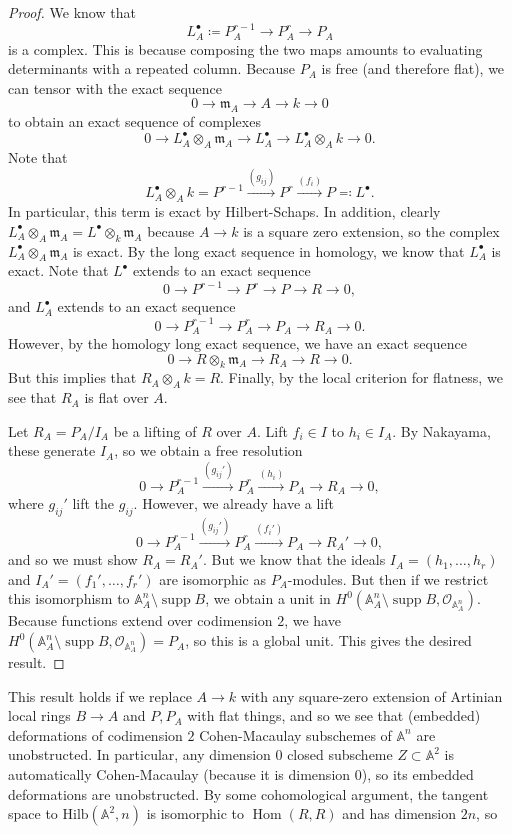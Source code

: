 \documentclass[leqno, openany]{memoir}
\theoremstyle{definition}
\theoremstyle{remark}
\theoremstyle{plain}
\theoremstyle{definition}
\theoremstyle{remark}
\newcommand{\A}{\mathbb{A}}
\newcommand{\mc}[1]{\mathcal{#1}}
\newcommand{\mf}[1]{\mathfrak{#1}}
\newcommand{\mr}[1]{\mathrm{#1}}
\DeclareMathOperator{\Hom}{Hom}
\DeclareMathOperator{\supp}{supp}
\begin{document}
\begin{proof}
    We know that 
    \[ L_A^{\bullet} \coloneqq P_A^{r-1} \to P_A^r \to P_A \]
    is a complex. This is because composing the two maps amounts to evaluating determinants with a repeated column. Because $P_A$ is free (and therefore flat), we can tensor with the exact sequence
    \[ 0 \to \mf{m}_A \to A \to k \to 0 \]
    to obtain an exact sequence of complexes
    \[ 0 \to L_A^{\bullet} \otimes_A \mf{m}_A \to L_A^{\bullet} \to L_A^{\bullet} \otimes_A k \to 0. \]
    Note that 
    \[ L_A^{\bullet} \otimes_A k = P^{r-1} \xrightarrow{(g_{ij})} P^r \xrightarrow{(f_i)} P \eqqcolon L^{\bullet}. \]
    In particular, this term is exact by Hilbert-Schaps. In addition, clearly $L_A^{\bullet} \otimes_A \mf{m}_A = L^{\bullet} \otimes_k \mf{m}_A$ because $A \to k$ is a square zero extension, so the complex $L_A^{\bullet} \otimes_A \mf{m}_A$ is exact. By the long exact sequence in homology, we know that $L_A^{\bullet}$ is exact. Note that $L^{\bullet}$ extends to an exact sequence
    \[ 0 \to P^{r-1} \to P^r \to P \to R \to 0, \]
    and $L_A^{\bullet}$ extends to an exact sequence
    \[ 0 \to P_A^{r-1} \to P_A^r \to P_A \to R_A \to 0. \]
    However, by the homology long exact sequence, we have an exact sequence
    \[ 0 \to R \otimes_k \mf{m}_A \to R_A \to R \to 0. \]
    But this implies that $R_A \otimes_A k = R$. Finally, by the local criterion for flatness, we see that $R_A$ is flat over $A$.

    Let $R_A = P_A / I_A$ be a lifting of $R$ over $A$. Lift $f_i \in I$ to $h_i \in I_A$. By Nakayama, these generate $I_A$, so we obtain a free resolution
    \[ 0 \to P_A^{r-1} \xrightarrow{(g_{ij}')} P_A^r \xrightarrow{(h_i)} P_A \to R_A \to 0, \]
    where $g_{ij}'$ lift the $g_{ij}$. However, we already have a lift
    \[ 0 \to P_A^{r-1} \xrightarrow{(g_{ij}')} P_A^r \xrightarrow{(f_i')} P_A \to R_A' \to 0, \]
    and so we must show $R_A = R_A'$. But we know that the ideals $I_A = (h_1, \ldots, h_r)$ and $I_A' = (f_1', \ldots, f_r')$ are isomorphic as $P_A$-modules. But then if we restrict this isomorphism to $\A^n_A \setminus \supp B$, we obtain a unit in $H^0(\A^n_A \setminus \supp B, \mc{O}_{\A^n_A})$. Because functions extend over codimension $2$, we have $H^0(\A^n_A \setminus \supp B, \mc{O}_{\A^n_A}) = P_A$, so this is a global unit. This gives the desired result.
\end{proof}

This result holds if we replace $A \to k$ with any square-zero extension of Artinian local rings $B \to A$ and $P, P_A$ with flat things, and so we see that (embedded) deformations of codimension $2$ Cohen-Macaulay subschemes of $\A^n$ are unobstructed. In particular, any dimension $0$ closed subscheme $Z \subset \A^2$ is automatically Cohen-Macaulay (because it is dimension $0$), so its embedded deformations are unobstructed. By some cohomological argument, the tangent space to $\mr{Hilb}(\A^2, n)$ is isomorphic to $\Hom(R, R)$ and has dimension $2n$, so 
\end{document}
